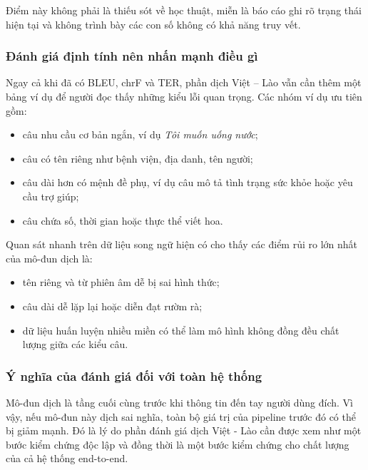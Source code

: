 Điểm này không phải là thiếu sót về học thuật, miễn là báo cáo ghi rõ trạng thái hiện tại và
không trình bày các con số không có khả năng truy vết.

\subsubsection{Đánh giá định tính nên nhấn mạnh điều gì}

Ngay cả khi đã có BLEU, chrF và TER, phần dịch Việt -- Lào vẫn cần thêm một bảng ví
dụ để người đọc thấy những kiểu lỗi quan trọng. Các nhóm ví dụ ưu tiên gồm:
\begin{itemize}
    \item câu nhu cầu cơ bản ngắn, ví dụ \textit{Tôi muốn uống nước};
    \item câu có tên riêng như bệnh viện, địa danh, tên người;
    \item câu dài hơn có mệnh đề phụ, ví dụ câu mô tả tình trạng sức khỏe hoặc yêu cầu trợ
    giúp;
    \item câu chứa số, thời gian hoặc thực thể viết hoa.
\end{itemize}

Quan sát nhanh trên dữ liệu song ngữ hiện có cho thấy các điểm rủi ro lớn nhất của mô-đun
dịch là:
\begin{itemize}
    \item tên riêng và từ phiên âm dễ bị sai hình thức;
    \item câu dài dễ lặp lại hoặc diễn đạt rườm rà;
    \item dữ liệu huấn luyện nhiều miền có thể làm mô hình không đồng đều chất lượng giữa
    các kiểu câu.
\end{itemize}

\subsubsection{Ý nghĩa của đánh giá đối với toàn hệ thống}

Mô-đun dịch là tầng cuối cùng trước khi thông tin đến tay người dùng đích. Vì vậy, nếu
mô-đun này dịch sai nghĩa, toàn bộ giá trị của pipeline trước đó có thể bị giảm mạnh. Đó là
lý do phần đánh giá dịch Việt - Lào cần được xem như một bước kiểm chứng độc lập và
đồng thời là một bước kiểm chứng cho chất lượng của cả hệ thống end-to-end.

